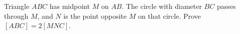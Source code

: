 Triangle $ABC$ has midpoint $M$ on $AB$. The circle with diameter $BC$ passes through $M$, and $N$ is the point opposite $M$ on that circle. Prove $[ABC]=2[MNC]$.
